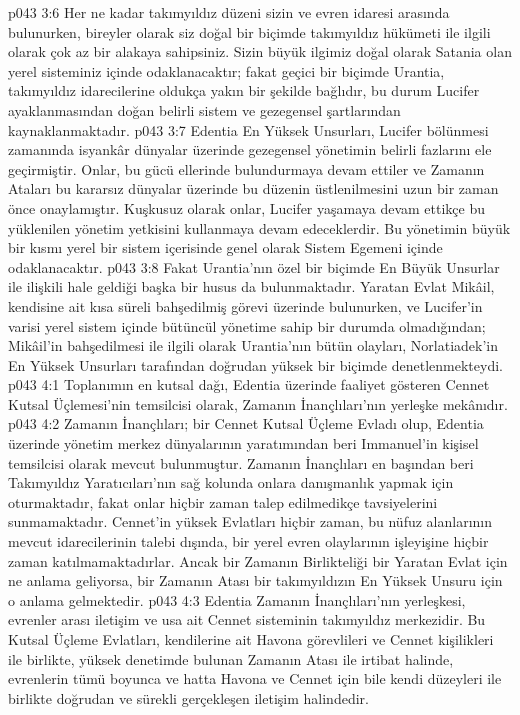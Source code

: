 \vs p043 3:6 Her ne kadar takımyıldız düzeni sizin ve evren idaresi arasında bulunurken, bireyler olarak siz doğal bir biçimde takımyıldız hükümeti ile ilgili olarak çok az bir alakaya sahipsiniz. Sizin büyük ilgimiz doğal olarak Satania olan yerel sisteminiz içinde odaklanacaktır; fakat geçici bir biçimde Urantia, takımyıldız idarecilerine oldukça yakın bir şekilde bağlıdır, bu durum Lucifer ayaklanmasından doğan belirli sistem ve gezegensel şartlarından kaynaklanmaktadır.
\vs p043 3:7 Edentia En Yüksek Unsurları, Lucifer bölünmesi zamanında isyankâr dünyalar üzerinde gezegensel yönetimin belirli fazlarını ele geçirmiştir. Onlar, bu gücü ellerinde bulundurmaya devam ettiler ve Zamanın Ataları bu kararsız dünyalar üzerinde bu düzenin üstlenilmesini uzun bir zaman önce onaylamıştır. Kuşkusuz olarak onlar, Lucifer yaşamaya devam ettikçe bu yüklenilen yönetim yetkisini kullanmaya devam edeceklerdir. Bu yönetimin büyük bir kısmı yerel bir sistem içerisinde genel olarak Sistem Egemeni içinde odaklanacaktır.
\vs p043 3:8 Fakat Urantia’nın özel bir biçimde En Büyük Unsurlar ile ilişkili hale geldiği başka bir husus da bulunmaktadır. Yaratan Evlat Mikâil, kendisine ait kısa süreli bahşedilmiş görevi üzerinde bulunurken, ve Lucifer’in varisi yerel sistem içinde bütüncül yönetime sahip bir durumda olmadığından; Mikâil’in bahşedilmesi ile ilgili olarak Urantia’nın bütün olayları, Norlatiadek’in En Yüksek Unsurları tarafından doğrudan yüksek bir biçimde denetlenmekteydi.
\vs p043 4:1 Toplanımın en kutsal dağı, Edentia üzerinde faaliyet gösteren Cennet Kutsal Üçlemesi’nin temsilcisi olarak, Zamanın İnançlıları’nın yerleşke mekânıdır.
\vs p043 4:2 Zamanın İnançlıları; bir Cennet Kutsal Üçleme Evladı olup, Edentia üzerinde yönetim merkez dünyalarının yaratımından beri Immanuel’in kişisel temsilcisi olarak mevcut bulunmuştur. Zamanın İnançlıları en başından beri Takımyıldız Yaratıcıları’nın sağ kolunda onlara danışmanlık yapmak için oturmaktadır, fakat onlar hiçbir zaman talep edilmedikçe tavsiyelerini sunmamaktadır. Cennet’in yüksek Evlatları hiçbir zaman, bu nüfuz alanlarının mevcut idarecilerinin talebi dışında, bir yerel evren olaylarının işleyişine hiçbir zaman katılmamaktadırlar. Ancak bir Zamanın Birlikteliği bir Yaratan Evlat için ne anlama geliyorsa, bir Zamanın Atası bir takımyıldızın En Yüksek Unsuru için o anlama gelmektedir.
\vs p043 4:3 Edentia Zamanın İnançlıları’nın yerleşkesi, evrenler arası iletişim ve usa ait Cennet sisteminin takımyıldız merkezidir. Bu Kutsal Üçleme Evlatları, kendilerine ait Havona görevlileri ve Cennet kişilikleri ile birlikte, yüksek denetimde bulunan Zamanın Atası ile irtibat halinde, evrenlerin tümü boyunca ve hatta Havona ve Cennet için bile kendi düzeyleri ile birlikte doğrudan ve sürekli gerçekleşen iletişim halindedir.
